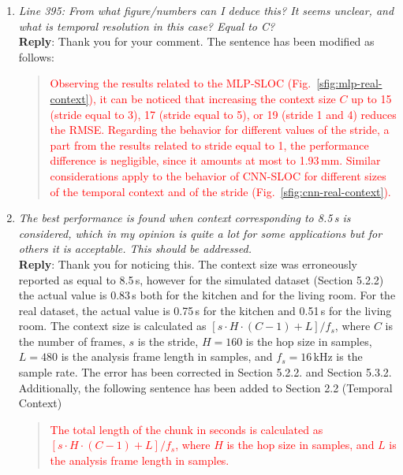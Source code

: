 \documentclass[11pt, technote, letterpaper, oneside, onecolumn]{IEEEtran}
\newcommand{\figref}[1]{Fig.~\ref{#1}}
\begin{document}
\begin{enumerate}
\item \textit{Line 395: From what figure/numbers can I deduce this? It seems unclear, and what is temporal resolution in this case? Equal to C?\\}
\textbf{Reply}: Thank you for your comment. The sentence has been modified as follows:
\begin{quote}
\textcolor{red}{Observing the results related to the MLP-SLOC (\figref{sfig:mlp-real-context}), it can be noticed that increasing the context size $C$ up to 15 (stride equal to 3), 17 (stride equal to 5), or 19 (stride 1 and 4) reduces the RMSE. Regarding the behavior for different values of the stride, a part from the results related to stride equal to 1, the performance difference is negligible, since it amounts at most to 1.93\,mm. Similar considerations apply to the behavior of CNN-SLOC for different sizes of the temporal context and of the stride (\figref{sfig:cnn-real-context}).}
\end{quote}


\item \textit{The best performance is found when context corresponding to 8.5\,s is considered, which in my opinion is quite a lot for some applications but for others it is acceptable. This should be addressed.\\}
\textbf{Reply}:  Thank you for noticing this. The context size was erroneously reported as equal to 8.5\,s, however for the simulated dataset (Section 5.2.2) the actual value is 0.83\,s both for the kitchen and for the living room. For the real dataset, the actual value is 0.75\,s for the kitchen and 0.51\,s for the living room. The context size is calculated as $\left [s\cdot H \cdot(C-1)+L \right ]/f_s$, where $C$ is the number of frames, $s$ is the stride, $H=160$ is the hop size in samples,  $L=480$ is the analysis frame length in samples, and $f_s=16$\,kHz is the sample rate. The error has been corrected in Section 5.2.2. and Section 5.3.2. Additionally, the following sentence has been added to Section 2.2 (Temporal Context)

\begin{quote}
\textcolor{red}{The total length of the chunk in seconds is calculated as $\left [s\cdot H \cdot(C-1)+L \right ]/f_s$, where $H$ is the hop size in samples, and $L$ is the analysis frame length in samples.}
\end{quote}


\end{enumerate}
\end{document}

